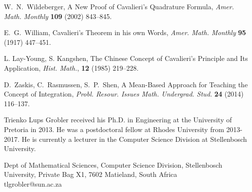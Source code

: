 \documentclass{article}
\theoremstyle{theorem}
\theoremstyle{definition}
\begin{document}
\begin{thebibliography}{10}
W.~N.~Wildeberger, A New Proof of Cavalieri's Quadrature Formula, \emph{Amer. Math. Monthly} \textbf{109} (2002) 843--845.

E.~G.~William, Cavalieri's Theorem in his own Words, \emph{Amer. Math. Monthly} \textbf{95} (1917) 447--451.

L. Lay-Young, S. Kangshen, The Chinese Concept of Cavalieri's Principle and Its Application, \emph{Hist. Math.}, \textbf{12} (1985) 219--228.
 
D.~Zaskis, C.~Rasmussen, S.~P.~Shen, A Mean-Based Approach for Teaching the Concept of Integration, \emph{Probl. Resour. Issues Math. Undergrad. Stud.} \textbf{24} (2014) 116--137.
\end{thebibliography}

\begin{biog}
\item[Trienko Lups Grobler] received his Ph.D. in Engineering at the University of Pretoria in 2013. He was 
a postdoctoral fellow at Rhodes University from 2013-2017. He is currently a lecturer in the Computer Science Division
at Stellenbosch University.
\begin{affil}
Dept of Mathematical Sciences, Computer Science Division, Stellenbosch University, Private Bag X1, 7602 Matieland, South Africa\\
tlgrobler@sun.ac.za
\end{affil}

\end{biog}
\vfill\eject
\end{document}
